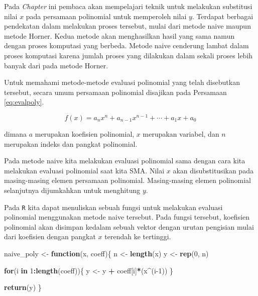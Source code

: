 \documentclass[
]{book}
\newenvironment{Shaded}{\begin{snugshade}}{\end{snugshade}}
\newcommand{\ControlFlowTok}[1]{\textcolor[rgb]{0.13,0.29,0.53}{\textbf{#1}}}
\newcommand{\DecValTok}[1]{\textcolor[rgb]{0.00,0.00,0.81}{#1}}
\newcommand{\FunctionTok}[1]{\textcolor[rgb]{0.13,0.29,0.53}{\textbf{#1}}}
\newcommand{\NormalTok}[1]{#1}
\newcommand{\OtherTok}[1]{\textcolor[rgb]{0.56,0.35,0.01}{#1}}
\newcommand{\SpecialCharTok}[1]{\textcolor[rgb]{0.81,0.36,0.00}{\textbf{#1}}}
\theoremstyle{definition}
\theoremstyle{definition}
\theoremstyle{definition}
\theoremstyle{definition}
\theoremstyle{remark}
\begin{document}
Pada \emph{Chapter} ini pembaca akan mempelajari teknik untuk melakukan substitusi nilai \(x\) pada persamaan polinomial untuk memperoleh nilai \(y\). Terdapat berbagai pendekatan dalam melakukan proses tersebut, mulai dari metode naive maupun metode Horner. Kedua metode akan menghasilkan hasil yang sama namun dengan proses komputasi yang berbeda. Metode naive cenderung lambat dalam proses komputasi karena jumlah proses yang dilakukan dalam sekali proses lebih banyak dari pada metode Horner.

Untuk memahami metode-metode evaluasi polinomial yang telah disebutkan tersebut, secara umum persamaan polinomial disajikan pada Persamaan \eqref{eq:evalpoly}.

\begin{equation}
f\left(x\right)=a_nx^n+a_{n-1}x^{n-1}+\cdots+a_1x+a_0
  \label{eq:evalpoly}
\end{equation}

dimana \(a\) merupakan koefisien polinomial, \(x\) merupakan variabel, dan \(n\) merupakan indeks dan pangkat polinomial.

Pada metode naive kita melakukan evaluasi polinomial sama dengan cara kita melakukan evaluasi polinomial saat kita SMA. Nilai \(x\) akan disubstitusikan pada masing-masing elemen persamaan polinomial. Masing-masing elemen polinomial selanjutnya dijumkahkan untuk menghitung \(y\).

Pada \texttt{R} kita dapat menuliskan sebuah fungsi untuk melakukan evaluasi polinomial menggunakan metode naive tersebut. Pada fungsi tersebut, koefisien polinomial akan disimpan kedalam sebuah vektor dengan urutan pengisian mulai dari koefisien dengan pangkat \(x\) terendah ke tertinggi.

\begin{Shaded}
\begin{Highlighting}[]
\NormalTok{naive\_poly }\OtherTok{\textless{}{-}} \ControlFlowTok{function}\NormalTok{(x, coeff)\{}
\NormalTok{  n }\OtherTok{\textless{}{-}} \FunctionTok{length}\NormalTok{(x)}
\NormalTok{  y }\OtherTok{\textless{}{-}} \FunctionTok{rep}\NormalTok{(}\DecValTok{0}\NormalTok{, n)}
  
  \ControlFlowTok{for}\NormalTok{(i }\ControlFlowTok{in} \DecValTok{1}\SpecialCharTok{:}\FunctionTok{length}\NormalTok{(coeff))\{}
\NormalTok{    y }\OtherTok{\textless{}{-}}\NormalTok{ y }\SpecialCharTok{+}\NormalTok{ coeff[i]}\SpecialCharTok{*}\NormalTok{(x}\SpecialCharTok{\^{}}\NormalTok{(i}\DecValTok{{-}1}\NormalTok{))}
\NormalTok{  \}}
  
  \FunctionTok{return}\NormalTok{(y)}
\NormalTok{\}}
\end{Highlighting}
\end{Shaded}
\end{document}
